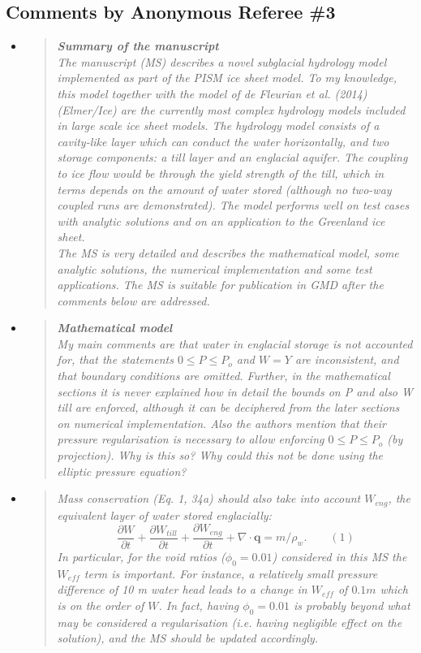 \documentclass[11pt,reqno]{amsart}
\newcommand{\reply}[2]{
\medskip\medskip
\item  \begin{quote}
\emph{#1}
\end{quote}

\medskip
\noindent #2}
\begin{document}
\subsection*{Comments by Anonymous Referee \#3}\begin{itemize}
\reply{\textbf{Summary of the manuscript}\\
The manuscript (MS) describes a novel subglacial hydrology model implemented as
part of the PISM ice sheet model. To my knowledge, this model together with the
model of de Fleurian et al. (2014) (Elmer/Ice) are the currently most complex hydrology
models included in large scale ice sheet models. The hydrology model consists of a
cavity-like layer which can conduct the water horizontally, and two storage components:
a till layer and an englacial aquifer. The coupling to ice flow would be through the yield
strength of the till, which in terms depends on the amount of water stored (although no
two-way coupled runs are demonstrated). The model performs well on test cases with
analytic solutions and on an application to the Greenland ice sheet.\\
The MS is very detailed and describes the mathematical model, some analytic solutions, the numerical implementation and some test applications. The MS is suitable for
publication in GMD after the comments below are addressed.}
{}

\reply{\textbf{Mathematical model}\\
My main comments are that water in englacial storage is not accounted for, that the
statements $0 \le P \le P_o$ and $W = Y$ are inconsistent, and that boundary conditions are
omitted. Further, in the mathematical sections it is never explained how in detail the
bounds on P and also W till are enforced, although it can be deciphered from the later
sections on numerical implementation. Also the authors mention that their pressure
regularisation is necessary to allow enforcing $0 \le P \le P_o$ (by projection).  Why is this
so? Why could this not be done using the elliptic pressure equation?}
{}

\reply{Mass conservation (Eq. 1, 34a) should also take into account $W_{eng}$, the equivalent
layer of water stored englacially:
   $$\frac{\partial W}{\partial t} + \frac{\partial W_{till}}{\partial t} + \frac{\partial W_{eng}}{\partial t} + \nabla \cdot \mathbf{q} = m /\rho_w. \qquad (1)$$
In particular, for the void ratios ($\phi_0 = 0.01$) considered in this MS the $W_{eff}$ term is
important.  For instance, a relatively small pressure difference of 10 m water head leads
to a change in $W_{eff}$ of $0.1 m$ which is on the order of $W$. In fact, having $\phi_0 = 0.01$ is
probably beyond what may be considered a regularisation (i.e. having negligible effect
on the solution), and the MS should be updated accordingly.}
{}


\end{itemize}
\end{document}
